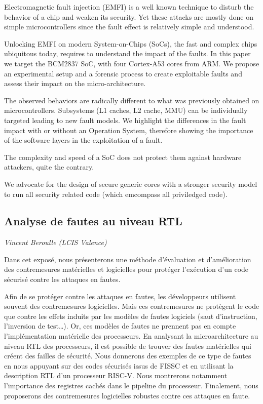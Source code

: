 \documentclass[a4paper,11pt]{article}
\begin{document}
Electromagnetic fault injection (EMFI) is a well known technique to disturb the behavior of a chip and
weaken its security. Yet these attacks are mostly done on simple
microcontrollers since the fault effect is relatively simple and understood.

Unlocking EMFI on modern System-on-Chips (SoCs), the fast and complex chips
ubiquitous today, requires to understand the impact of the faults. In this
paper we target the BCM2837 SoC, with four Cortex-A53 cores from ARM. We
propose an experimental setup and a forensic process to create exploitable
faults and assess their impact on the micro-architecture.

The observed behaviors are radically different to what was previously obtained
on microcontrollers. Subsystems (L1 caches, L2 cache, MMU) can be
individually targeted leading to new fault models. We highlight the
differences in the fault impact with or without an Operation System, therefore showing
the importance of the software layers in the exploitation of a fault.

The complexity and speed of a SoC does not protect them against hardware
attackers, quite the contrary.

We advocate for the design of secure generic cores with a stronger security
model to run all security related code (which emcompass all priviledged code).

\subsection{Analyse de fautes au niveau RTL}
\label{sec:org411958b}
\emph{Vincent Beroulle (LCIS Valence)}

Dans cet exposé, nous présenterons une méthode d’évaluation et
d’amélioration des contremesures matérielles et logicielles pour
protéger l’exécution d’un code sécurisé contre les attaques en fautes.

Afin de se protéger contre les attaques en fautes, les développeurs
utilisent souvent des contremesures logicielles. Mais ces
contremesures ne protègent le code que contre les effets induits par
les modèles de fautes logiciels (saut d’instruction, l’inversion de
test\ldots{}). Or, ces modèles de fautes ne prennent pas en compte
l’implémentation matérielle des processeurs. En analysant la
microarchitecture au niveau RTL des processeurs, il est possible de
trouver des fautes matérielles qui créent des failles de
sécurité. Nous donnerons des exemples de ce type de fautes en nous
appuyant sur des codes sécurisés issus de FISSC et en utilisant la
description RTL d’un processeur RISC-V. Nous montrerons notamment
l’importance des registres cachés dans le pipeline du
processeur. Finalement, nous proposerons des contremesures logicielles
robustes contre ces attaques en faute.
\end{document}
